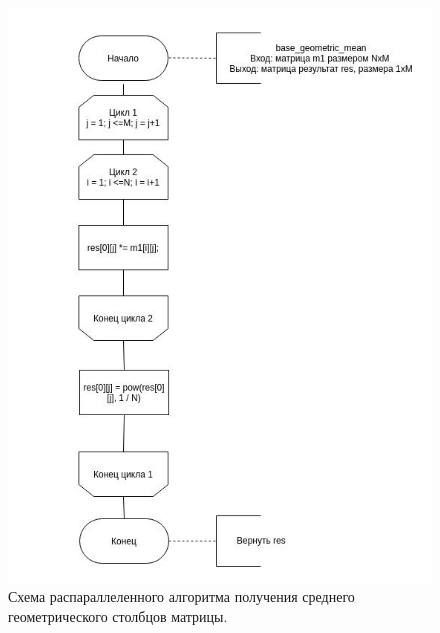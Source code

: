     \begin{figure}[h]
    	\centering
    	\includegraphics[scale=0.9]{base.jpg}
    	\caption{Схема распараллеленного алгоритма получения среднего геометрического столбцов матрицы.}
    	\label{fig:mpr}
    \end{figure}
    
